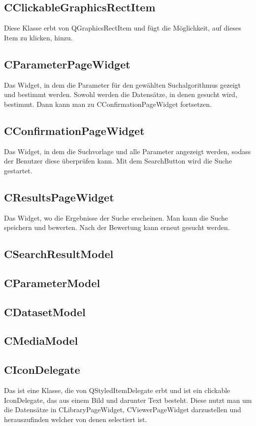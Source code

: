 \subsection*{CClickableGraphicsRectItem}
Diese Klasse erbt von QGraphicsRectItem und fügt die Möglichkeit, auf dieses Item zu klicken, hinzu.

\subsection*{CParameterPageWidget}
Das Widget, in dem die Parameter für den gewählten Suchalgorithmus gezeigt und bestimmt werden. Sowohl werden die Datensätze, in denen gesucht wird, bestimmt. Dann kann man zu CConfirmationPageWidget fortsetzen.

\subsection*{CConfirmationPageWidget}
Das Widget, in dem die Suchvorlage und alle Parameter angezeigt werden, sodass der Benutzer diese überprüfen kann. Mit dem SearchButton wird die Suche gestartet.

\subsection*{CResultsPageWidget}
Das Widget, wo die Ergebnisse der Suche erscheinen. Man kann die Suche speichern und bewerten. Nach der Bewertung kann erneut gesucht werden.

\subsection*{CSearchResultModel}

\subsection*{CParameterModel}

\subsection*{CDatasetModel}

\subsection*{CMediaModel}

\subsection*{CIconDelegate}
Das ist eine Klasse, die von QStyledItemDelegate erbt und ist ein clickable IconDelegate, das aus einem Bild und darunter Text besteht. Diese nutzt man um die Datensätze in CLibraryPageWidget, CViewerPageWidget darzustellen und herauszufinden welcher von denen selectiert ist.


